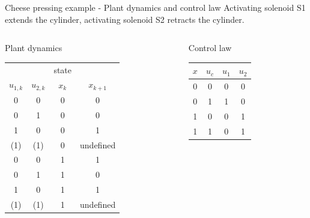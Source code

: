 \documentclass[presentation,aspectratio=1610]{beamer}
\begin{document}
\begin{frame}[label={sec:org08ed2a4}]{Cheese pressing example - Plant dynamics and control law}
Activating solenoid S1 extends the cylinder, activating solenoid S2 retracts the cylinder.
\begin{columns}
\begin{column}{0.5\columnwidth}
\begin{block}{Plant dynamics}
\begin{center}
\begin{tabular}{|cc|cc|}
\hline
 &  & state & \\
\(u_{1,k}\) & \(u_{2,k}\) & \(x_k\) & \(x_{k+1}\)\\
\hline
0 & 0 & 0 & 0\\
0 & 1 & 0 & 0\\
1 & 0 & 0 & 1\\
(1) & (1) & 0 & undefined\\
0 & 0 & 1 & 1\\
0 & 1 & 1 & 0\\
1 & 0 & 1 & 1\\
(1) & (1) & 1 & undefined\\
\hline
\end{tabular}
\end{center}
\end{block}
\end{column}

\begin{column}{0.5\columnwidth}
\begin{block}{Control law}
\begin{center}
\begin{tabular}{|cc|cc|}
\hline
\(x\) & \(u_{c}\) & \(u_1\) & \(u_2\)\\
\hline
0 & 0 & 0 & 0\\
0 & 1 & 1 & 0\\
1 & 0 & 0 & 1\\
1 & 1 & 0 & 1\\
\hline
\end{tabular}
\end{center}
\end{block}
\end{column}
\end{columns}
\end{frame}
\end{document}
